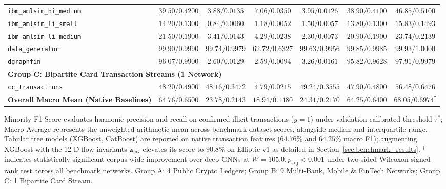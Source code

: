\begin{table}[t]
{\begin{tabular}{lcccccc}
\texttt{ibm\_amlsim\_hi\_medium} & $39.50 / 0.4200$ & $3.88 / 0.0135$ & $7.06 / 0.0350$ & $3.95 / 0.0126$ & $38.90 / 0.4100$ & $\mathbf{46.85 / 0.5100}$ \\
\texttt{ibm\_amlsim\_li\_small} & $14.20 / 0.1300$ & $0.84 / 0.0060$ & $1.18 / 0.0052$ & $1.50 / 0.0057$ & $13.80 / 0.1300$ & $\mathbf{15.83 / 0.1493}$ \\
\texttt{ibm\_amlsim\_li\_medium} & $21.50 / 0.1900$ & $3.41 / 0.0143$ & $4.29 / 0.0238$ & $2.30 / 0.0073$ & $20.90 / 0.1900$ & $\mathbf{23.74 / 0.2139}$ \\
\texttt{data\_generator} & $99.90 / 0.9990$ & $99.74 / 0.9979$ & $62.72 / 0.6327$ & $99.63 / 0.9956$ & $99.85 / 0.9985$ & $\mathbf{99.93 / 1.0000}$ \\
\texttt{dgraphfin} & $96.07 / 0.9900$ & $2.60 / 0.0129$ & $2.59 / 0.0094$ & $3.26 / 0.0161$ & $95.82 / 0.9628$ & $\mathbf{97.91 / 0.9979}$ \\
\midrule
\multicolumn{7}{l}{\textbf{Group C: Bipartite Card Transaction Streams (1 Network)}} \\
\texttt{cc\_transactions} & $48.20 / 0.4900$ & $48.16 / 0.3472$ & $4.79 / 0.0215$ & $49.24 / 0.3555$ & $47.90 / 0.4800$ & $\mathbf{56.48 / 0.6476}$ \\
\midrule
\textbf{Overall Macro Mean (Native Baselines)} & $64.76 / 0.6500$ & $23.78 / 0.2143$ & $18.94 / 0.1480$ & $24.31 / 0.2170$ & $64.25 / 0.6400$ & $\mathbf{68.05 / 0.6974}^\dagger$ \\
\bottomrule
\end{tabular}%
}
\vspace{1.0ex}

\footnotesize{Minority F1-Score evaluates harmonic precision and recall on confirmed illicit transactions ($y=1$) under validation-calibrated threshold $\tau^*$; Macro-Average represents the unweighted arithmetic mean across benchmark dataset scores, alongside median and interquartile range. Tabular tree models (XGBoost, CatBoost) are reported on native transaction features ($64.76\%$ and $64.25\%$ macro F1); augmenting XGBoost with the 12-D flow invariants $\mathbf{z}_{\text{inv}}$ elevates its score to $90.8\%$ on Elliptic-v1 as detailed in Section~\ref{sec:benchmark_results}. $^\dagger$ indicates statistically significant corpus-wide improvement over deep GNNs at $W=105.0, p_{\text{adj}} < 0.001$ under two-sided Wilcoxon signed-rank test across all benchmark networks. Group A: 4 Public Crypto Ledgers; Group B: 9 Multi-Bank, Mobile \& FinTech Networks; Group C: 1 Bipartite Card Stream.}
\end{table}